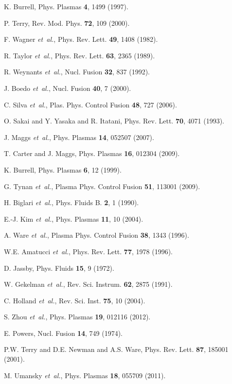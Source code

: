 \documentclass[aps,prl,amsmath,amssymb,preprint,superscriptaddress]{revtex4} %
\begin{document}
\providecommand{\noopsort}[1]{}\providecommand{\singleletter}[1]{#1}%
\begin{thebibliography}{10}

K. Burrell, Phys. Plasmas {\bf 4},  1499  (1997).

P. Terry, Rev. Mod. Phys. {\bf 72},  109  (2000).

F. Wagner {\it et~al.}, Phys. Rev. Lett. {\bf 49},  1408  (1982).

R. Taylor {\it et~al.}, Phys. Rev. Lett. {\bf 63},  2365  (1989).

R. Weynants {\it et~al.}, Nucl. Fusion {\bf 32},  837  (1992).

J. Boedo {\it et~al.}, Nucl. Fusion {\bf 40},  7  (2000).

C. Silva {\it et~al.}, Plas. Phys. Control Fusion {\bf 48},  727  (2006).

O. Sakai and Y. Yasaka and R. Itatani, Phys. Rev. Lett. {\bf 70},  4071 (1993).

J. Maggs {\it et~al.}, Phys. Plasmas {\bf 14},  052507  (2007).

T. Carter and J. Maggs, Phys. Plasmas {\bf 16},  012304  (2009).

K. Burrell, Phys. Plasmas {\bf 6},  12  (1999).

G. Tynan {\it et~al.}, Plasma Phys. Control Fusion {\bf 51}, 113001  (2009).

H. Biglari {\it et~al.}, Phys. Fluids B. {\bf 2},  1  (1990).

E.-J. Kim {\it et~al.}, Phys. Plasmas {\bf 11},  10  (2004).

A. Ware {\it et~al.}, Plasma Phys. Control Fusion
  {\bf 38},  1343  (1996).

W.E. Amatucci {\it et~al.}, Phys. Rev. Lett. {\bf 77},  1978  (1996).

D. Jassby, Phys. Fluids {\bf 15},  9  (1972).

W. Gekelman {\it et~al.}, Rev. Sci. Instrum. {\bf 62},  2875  (1991).

C. Holland {\it et~al.}, Rev. Sci. Inst. {\bf 75},  10
  (2004).

S. Zhou {\it et~al.}, Phys. Plasmas {\bf 19},  012116  (2012).

E. Powers, Nucl. Fusion {\bf 14},  749  (1974).

P.W. Terry and D.E. Newman and A.S. Ware, Phys. Rev. Lett. {\bf 87}, 185001  (2001).

M. Umansky {\it et~al.}, Phys. Plasmas {\bf 18},  055709  (2011).

\end{thebibliography}
\end{document}
